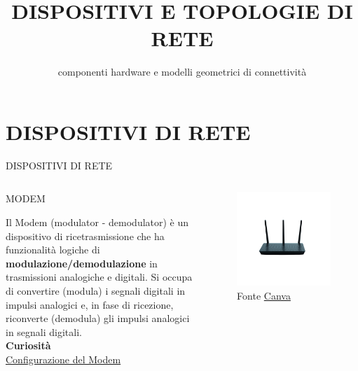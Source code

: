 \documentclass[aspectratio=1610,handout]{beamer}
\title{DISPOSITIVI E TOPOLOGIE DI RETE}
\subtitle{componenti hardware e modelli geometrici di connettività}
\date{}
\institute{\textit{
        Fonti:
        \begin{itemize}
            \item[-] \href{https://it.wikipedia.org/wiki/Rete_di_computer}{Wikipedia}
            \item[-] \href{https://www.fastweb.it/fastweb-plus/digital-magazine/}{Fastweb Plus}
        \end{itemize}
    }
}
\begin{document}
\begin{frame}
    \titlepage
\end{frame}

\section{DISPOSITIVI DI RETE}

\begin{frame}{DISPOSITIVI DI RETE}
    \begin{columns}
            \justifying
            \begin{alertblock}{MODEM}
                \begin{minipage}{0.96\linewidth}
                    \justifying
                    Il Modem (modulator - demodulator) è un dispositivo di ricetrasmissione che ha 
                    funzionalità logiche di \textbf{modulazione/demodulazione} in trasmissioni analogiche e digitali. 
                    Si occupa di convertire (modula) i segnali digitali in impulsi analogici e, in fase di ricezione, 
                    riconverte (demodula) gli impulsi analogici in segnali digitali.\\
                    \bigskip
                    \tiny{\textbf{Curiosità}}\\
                    \tiny{\href{https://www.fastweb.it/fastweb-plus/digital-magazine/i-consigli-per-configurare-un-modem-router-wifi/}{Configurazione del Modem}}
                \end{minipage}
            \end{alertblock}
            \begin{figure}
                \includegraphics[width=\linewidth]{img/modemrouter.png}
                \caption{{Fonte \href{https://www.canva.com/}{Canva}}}
            \end{figure}
    \end{columns}
\end{frame}
\end{document}

